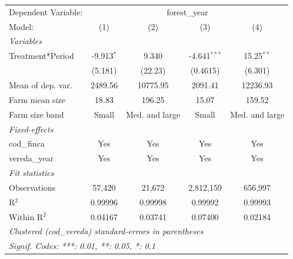 
\begingroup
\centering
\begin{tabular}{lcccc}
   \tabularnewline \midrule \midrule
   Dependent Variable: & \multicolumn{4}{c}{forest\_year}\\
   Model:            & (1)          & (2)            & (3)            & (4)\\  
   \midrule
   \emph{Variables}\\
   Treatment*Period  & -9.913$^{*}$ & 9.340          & -4.641$^{***}$ & 15.25$^{**}$\\   
                     & (5.181)      & (22.23)        & (0.4615)       & (6.301)\\   
   Mean of dep. var. & 2489.56      & 10775.95       & 2091.41        & 12236.93\\  
   Farm mean size    & 18.83        & 196.25         & 15.07          & 159.52\\  
   Farm size band    & Small        & Med. and large & Small          & Med. and large\\  
   \midrule
   \emph{Fixed-effects}\\
   cod\_finca        & Yes          & Yes            & Yes            & Yes\\  
   vereda\_year      & Yes          & Yes            & Yes            & Yes\\  
   \midrule
   \emph{Fit statistics}\\
   Observations      & 57,420       & 21,672         & 2,812,159      & 656,997\\  
   R$^2$             & 0.99996      & 0.99998        & 0.99992        & 0.99993\\  
   Within R$^2$      & 0.04167      & 0.03741        & 0.07400        & 0.02184\\  
   \midrule \midrule
   \multicolumn{5}{l}{\emph{Clustered (cod\_vereda) standard-errors in parentheses}}\\
   \multicolumn{5}{l}{\emph{Signif. Codes: ***: 0.01, **: 0.05, *: 0.1}}\\
\end{tabular}
\par\endgroup


